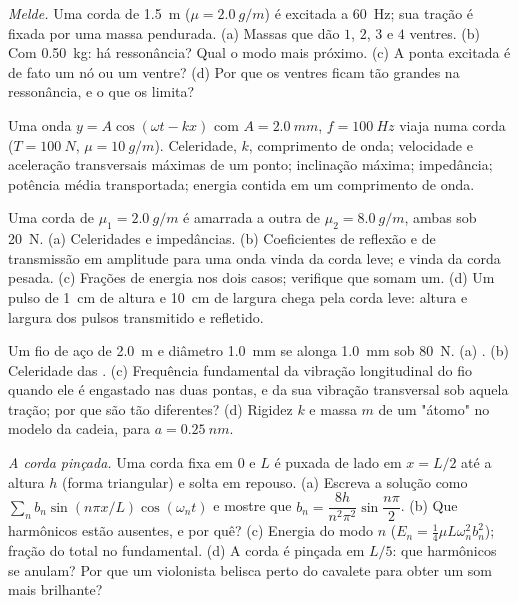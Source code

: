 \begin{exercise}[$\star\star$]\label{exo:b2:waves-on-strings:6}
\emph{Melde.} Uma corda de \qty{1.5}{m} ($\mu = \qty{2.0}{g/m}$) é excitada a
\qty{60}{Hz}; sua tração é fixada por uma massa pendurada. (a) Massas que dão
$1$, $2$, $3$ e $4$ ventres. (b) Com \qty{0.50}{kg}: há ressonância?
Qual o modo mais próximo. (c) A ponta excitada é de fato um nó ou um ventre?
(d) Por que os ventres ficam tão grandes na ressonância, e o que os limita?
\end{exercise}

\begin{exercise}[$\star\star$]\label{exo:b2:waves-on-strings:7}
Uma onda $y = A\cos(\omega t - kx)$ com $A = \qty{2.0}{mm}$, $f = \qty{100}{Hz}$
viaja numa corda ($T = \qty{100}{N}$, $\mu = \qty{10}{g/m}$). Celeridade, $k$,
comprimento de onda; velocidade e aceleração transversais máximas de um ponto;
inclinação máxima; impedância; potência média transportada; energia contida em um
comprimento de onda.
\end{exercise}

\begin{exercise}[$\star\star$]\label{exo:b2:waves-on-strings:8}
Uma corda de $\mu_1 = \qty{2.0}{g/m}$ é amarrada a outra de $\mu_2 = \qty{8.0}{g/m}$,
ambas sob \qty{20}{N}. (a) Celeridades e impedâncias. (b) Coeficientes de
reflexão e de transmissão em amplitude para uma onda vinda da
corda leve; e vinda da corda pesada. (c) Frações de energia nos dois
casos; verifique que somam um. (d) Um pulso de \qty{1}{cm} de altura e \qty{10}{cm} de largura
chega pela corda leve: altura e largura dos pulsos transmitido e
refletido.
\end{exercise}

\begin{exercise}[$\star\star$]\label{exo:b2:waves-on-strings:9}
Um fio de aço de \qty{2.0}{m} e diâmetro \qty{1.0}{mm} se alonga \qty{1.0}{mm}
sob \qty{80}{N}. (a) . (b) Celeridade das .
(c) Frequência fundamental da vibração longitudinal do fio quando ele
é engastado nas duas pontas, e da sua vibração transversal sob aquela
tração; por que são tão diferentes? (d) Rigidez $k$ e massa $m$ de um
"átomo" no modelo da cadeia, para $a = \qty{0.25}{nm}$.
\end{exercise}

\begin{exercise}[$\star\star\star$]\label{exo:b2:waves-on-strings:10}
\emph{A corda pinçada.} Uma corda fixa em $0$ e $L$ é puxada de lado
em $x = L/2$ até a altura $h$ (forma triangular) e solta em repouso.
(a) Escreva a solução como $\sum_nb_n\sin(n\pi x/L)\cos(\omega_nt)$ e mostre
que $b_n = \dfrac{8h}{n^2\pi^2}\sin\dfrac{n\pi}2$. (b) Que harmônicos estão
ausentes, e por quê? (c) Energia do modo $n$ ($E_n = \tfrac14\mu L\omega_n^2b_n^2$);
fração do total no fundamental. (d) A corda é pinçada em
$L/5$: que harmônicos se anulam? Por que um violonista belisca perto
do cavalete para obter um som mais brilhante?
\end{exercise}

